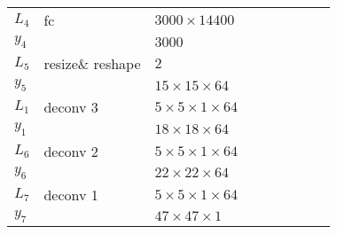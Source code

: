 \begin{table}[h!]
{\begin{tabular}{|lllllllll|}
			\multicolumn{1}{|l|}{$L_4$}   & fc               & \multicolumn{1}{l|}{$3000\times 14400$}          &                & \multicolumn{1}{l|}{}                      \\
			\multicolumn{1}{|l|}{$y_4$}   &                  & \multicolumn{1}{l|}{$3000$}                      &                & \multicolumn{1}{l|}{}                      \\ \hline

			\multicolumn{1}{|l|}{$L_5$}   & resize\& reshape & \multicolumn{1}{l|}{$2$}                         &                & \multicolumn{1}{l|}{}                      \\
			\multicolumn{1}{|l|}{$y_5$}   &                  & \multicolumn{1}{l|}{$15\times15\times 64$}       &                & \multicolumn{1}{l|}{}                      \\ \hline

			\multicolumn{1}{|l|}{$L_1$}   & deconv 3         & \multicolumn{1}{l|}{$5\times 5\times1\times 64$} &                & \multicolumn{1}{l|}{}                      \\
			\multicolumn{1}{|l|}{$y_1$}   &                  & \multicolumn{1}{l|}{$18\times18\times64$}        &                & \multicolumn{1}{l|}{}                      \\ \hline

			\multicolumn{1}{|l|}{$L_6$}   & deconv 2         & \multicolumn{1}{l|}{$5\times 5\times1\times 64$} &                & \multicolumn{1}{l|}{}                      \\
			\multicolumn{1}{|l|}{$y_6$}   &                  & \multicolumn{1}{l|}{$22\times22\times64$}        &                & \multicolumn{1}{l|}{}                      \\ \hline


			\multicolumn{1}{|l|}{$L_7$}   & deconv 1         & \multicolumn{1}{l|}{$5\times 5\times1\times 64$} &                & \multicolumn{1}{l|}{}                      \\
			\multicolumn{1}{|l|}{$y_7$}   &                  & \multicolumn{1}{l|}{$47\times47\times1$}         &                & \multicolumn{1}{l|}{}                      \\ \hline
		\end{tabular}
		\caption{} \label{net:2}
	}
\end{table}
\newpage
